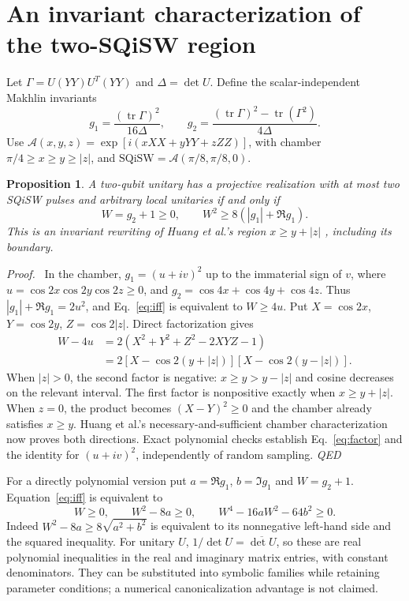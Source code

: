 \documentclass[a4paper,onecolumn,11pt,unpublished]{quantumarticle}
\newtheorem{proposition}{Proposition}
\newenvironment{proof}[1][Proof]{\par\noindent\textit{#1.}\ }{\hfill\textit{QED}\par}
\newcommand{\Sqi}{\mathrm{SQiSW}}
\newcommand{\A}{\mathcal A}
\begin{document}
\section{An invariant characterization of the two-SQiSW region}
Let $\Gamma=U(YY)U^T(YY)$ and $\Delta=\det U$. Define the scalar-independent
Makhlin invariants \cite{makhlin}
\begin{equation}
 g_1=\frac{(\operatorname{tr}\Gamma)^2}{16\Delta},\qquad
 g_2=\frac{(\operatorname{tr}\Gamma)^2-\operatorname{tr}(\Gamma^2)}{4\Delta}.
\end{equation}
Use $\A(x,y,z)=\exp[i(xXX+yYY+zZZ)]$, with chamber
$\pi/4\ge x\ge y\ge|z|$, and $\Sqi=\A(\pi/8,\pi/8,0)$.
\begin{proposition}\label{thm:sqisw}
A two-qubit unitary has a projective realization with at most two SQiSW
pulses and arbitrary local unitaries if and only if
\begin{equation}\label{eq:iff}
 W=g_2+1\ge0,\qquad W^2\ge8(|g_1|+\Re g_1).
\end{equation}
This is an invariant rewriting of Huang et al.'s region $x\ge y+|z|$
\cite{sqisw}, including its boundary.
\end{proposition}
\begin{proof}
In the chamber, $g_1=(u+iv)^2$ up to the immaterial sign of $v$, where
$u=\cos2x\cos2y\cos2z\ge0$, and
$g_2=\cos4x+\cos4y+\cos4z$. Thus
$|g_1|+\Re g_1=2u^2$, and Eq.~\eqref{eq:iff} is equivalent to $W\ge4u$.
Put $X=\cos2x$, $Y=\cos2y$, $Z=\cos2|z|$. Direct factorization gives
\begin{align}
 W-4u&=2(X^2+Y^2+Z^2-2XYZ-1)\nonumber\\
 &=2[X-\cos2(y+|z|)][X-\cos2(y-|z|)].\label{eq:factor}
\end{align}
When $|z|>0$, the second factor is negative: $x\ge y>y-|z|$ and
cosine decreases on the relevant interval. The first factor is nonpositive
exactly when $x\ge y+|z|$. When $z=0$, the product becomes
$(X-Y)^2\ge0$ and the chamber already satisfies $x\ge y$.
Huang et al.'s necessary-and-sufficient chamber characterization now proves
both directions. Exact polynomial checks establish Eq.~\eqref{eq:factor}
and the identity for $(u+iv)^2$, independently of random sampling.
\end{proof}
For a directly polynomial version put $a=\Re g_1$, $b=\Im g_1$ and
$W=g_2+1$. Equation~\eqref{eq:iff} is equivalent to
\begin{equation}\label{eq:polynomial}
 W\ge0,\qquad W^2-8a\ge0,\qquad W^4-16aW^2-64b^2\ge0.
\end{equation}
Indeed $W^2-8a\ge8\sqrt{a^2+b^2}$ is equivalent to its nonnegative
left-hand side and the squared inequality. For unitary $U$,
$1/\det U=\overline{\det U}$, so these are real polynomial inequalities in
the real and imaginary matrix entries, with constant denominators.
They can be substituted into symbolic families while retaining parameter
conditions; a numerical canonicalization advantage is not claimed.
\end{document}
